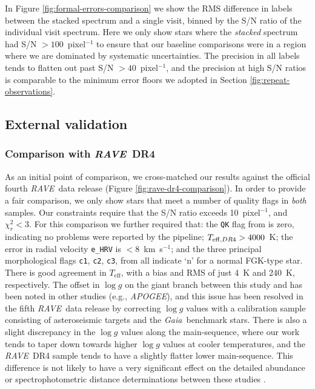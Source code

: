 \documentclass[preprint,trackchanges]{aastex}
\newcommand{\acronym}[1]{{\small{#1}}}
\newcommand{\project}[1]{\textsl{#1}}
\newcommand{\gaia}{\project{Gaia}}
\newcommand{\rave}{\project{\acronym{RAVE}}}
\newcommand{\apogee}{\project{\acronym{APOGEE}}}
\newcommand{\teff}{T_{\mathrm{eff}}}
\newcommand{\logg}{\log g}
\begin{document}
In Figure \ref{fig:formal-errors-comparison} we show the RMS difference
in labels between the stacked spectrum and a single visit, binned by the
S/N ratio of the individual visit spectrum.  Here we only show stars
where the \emph{stacked} spectrum had S/N $>100$~pixel$^{-1}$ to ensure
that our baseline comparisons were in a region where we are dominated
by systematic uncertainties.  The precision in all labels tends to
flatten out past S/N $> 40$~pixel$^{-1}$, and the precision at high S/N
ratios is comparable to the minimum error floors we adopted in Section
\ref{fig:repeat-observations}.


\subsection{External validation}
\label{sec:external-validation}

\subsubsection{Comparison with \rave\ DR4}
\label{sec:validation-kordopatis}

As an initial point of comparison, we cross-matched our results against the 
official fourth \rave\ data release (Figure \ref{fig:rave-dr4-comparison}).
In order to provide a fair comparison, we only show stars that meet a number
of quality flags in \emph{both} samples.  Our constraints require that the
S/N ratio exceeds 10~pixel$^{-1}$, and $\chi_r^2 < 3$.  For this comparison
we further required that:
the \texttt{QK} flag from \citet{Kordopatis_2013} is zero, indicating no
problems were reported by the pipeline; $T_{{\rm eff},DR4} > 4000$~K;
the error in radial velocity \texttt{e\_HRV} is $<$8~km~s$^{-1}$; and the three
principal morphological flags \texttt{c1}, \texttt{c2}, \texttt{c3}, from 
\citet{Matijevic_2012} all indicate `n' for a normal FGK-type star.
There is good agreement in $\teff$, with a bias and RMS of just 4~K and 240~K,
respectively. The offset in $\logg$ on the giant branch between this study and 
\citet{Kordopatis_2013} has been noted in other studies (e.g., \apogee), and this issue
has been resolved in the fifth \rave\ data release by correcting $\logg$
values with a calibration sample consisting of asteroseismic targets and the
\gaia\ benchmark stars.  There is also a
slight discrepancy in the $\logg$ values along the main-sequence, where our
work tends to taper down towards higher $\logg$ values at cooler temperatures,
and the \rave\ DR4 sample tends to have a slightly flatter lower main-sequence.
This difference is not likely to have a very significant effect on the detailed
abundance or spectrophotometric distance determinations between these studies 
\citep{Binney_2014}.
\end{document}

